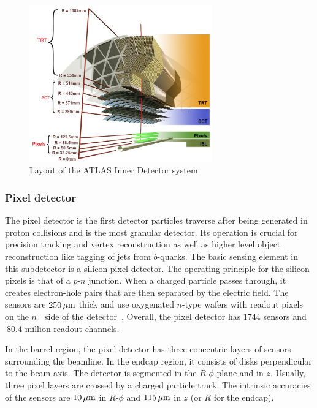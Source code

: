 \begin{figure}[h!]
  \centering
  \captionsetup{justification=centering}

  \includegraphics[width=0.7\textwidth]{figures/ATLAS_ID}
   \caption{Layout of the ATLAS Inner Detector system~\cite{Run2Tracking}}
  \label{fig:ID}
\end{figure}

\subsubsection{Pixel detector}

The pixel detector is the first detector particles traverse after being generated in proton collisions and is the most granular detector. Its operation is crucial for precision tracking and vertex reconstruction as well as higher level object reconstruction like tagging of jets from $b$-quarks. The basic sensing element in this subdetector is a silicon pixel detector. The operating principle for the silicon pixels is that of a $p$-$n$ junction. When a charged particle passes through, it creates electron-hole pairs that are then separated by the electric field. The sensors are $250\,\mu\rm m$ thick and use oxygenated $n$-type wafers with readout pixels on the $n^+$ side of the detector~\cite{ATLASPaper}. Overall, the pixel detector has $1744$ sensors and $~80.4$ million readout channels.

In the barrel region, the pixel detector has three concentric layers of sensors surrounding the beamline. In the endcap region, it consists of disks perpendicular to the beam axis. The detector is segmented in the $R$-$\phi$ plane and in $z$. Usually, three pixel layers are crossed by a charged particle track. The intrinsic accuracies of the sensors are $10\,\mu\rm m$ in $R$-$\phi$ and $115\,\mu\rm m$ in $z$ (or $R$ for the endcap).


